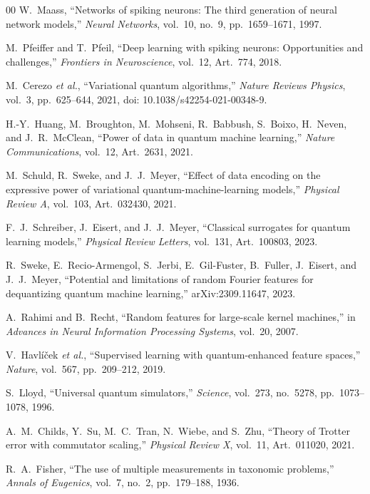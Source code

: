 \documentclass[10pt,a4paper]{article}
\begin{document}
\begin{thebibliography}{00}
W.~Maass,
``Networks of spiking neurons: The third generation of neural network models,''
\textit{Neural Networks}, vol.~10, no.~9, pp.~1659--1671, 1997.

M.~Pfeiffer and T.~Pfeil,
``Deep learning with spiking neurons: Opportunities and challenges,''
\textit{Frontiers in Neuroscience}, vol.~12, Art.~774, 2018.

M.~Cerezo \textit{et al.},
``Variational quantum algorithms,''
\textit{Nature Reviews Physics}, vol.~3, pp.~625--644, 2021,
doi: 10.1038/s42254-021-00348-9.

H.-Y.~Huang, M.~Broughton, M.~Mohseni, R.~Babbush, S.~Boixo, H.~Neven, and J.~R.~McClean,
``Power of data in quantum machine learning,''
\textit{Nature Communications}, vol.~12, Art.~2631, 2021.

M.~Schuld, R.~Sweke, and J.~J.~Meyer,
``Effect of data encoding on the expressive power of variational quantum-machine-learning models,''
\textit{Physical Review A}, vol.~103, Art.~032430, 2021.

F.~J.~Schreiber, J.~Eisert, and J.~J.~Meyer,
``Classical surrogates for quantum learning models,''
\textit{Physical Review Letters}, vol.~131, Art.~100803, 2023.

R.~Sweke, E.~Recio-Armengol, S.~Jerbi, E.~Gil-Fuster, B.~Fuller, J.~Eisert, and J.~J.~Meyer,
``Potential and limitations of random Fourier features for dequantizing quantum machine learning,''
arXiv:2309.11647, 2023.

A.~Rahimi and B.~Recht,
``Random features for large-scale kernel machines,''
in \textit{Advances in Neural Information Processing Systems}, vol.~20, 2007.

V.~Havl\'{i}\v{c}ek \textit{et al.},
``Supervised learning with quantum-enhanced feature spaces,''
\textit{Nature}, vol.~567, pp.~209--212, 2019.

S.~Lloyd,
``Universal quantum simulators,''
\textit{Science}, vol.~273, no.~5278, pp.~1073--1078, 1996.

A.~M.~Childs, Y.~Su, M.~C.~Tran, N.~Wiebe, and S.~Zhu,
``Theory of Trotter error with commutator scaling,''
\textit{Physical Review X}, vol.~11, Art.~011020, 2021.

R.~A.~Fisher,
``The use of multiple measurements in taxonomic problems,''
\textit{Annals of Eugenics}, vol.~7, no.~2, pp.~179--188, 1936.


\end{thebibliography}
\end{document}

